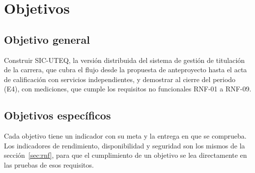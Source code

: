 \section{Objetivos}\label{sec:objetivos}

\subsection{Objetivo general}

Construir SIC-UTEQ, la versión distribuida del sistema de gestión de titulación de la carrera, que cubra el flujo desde la propuesta de anteproyecto hasta el acta de calificación con servicios independientes, y demostrar al cierre del periodo (E4), con mediciones, que cumple los requisitos no funcionales RNF-01 a RNF-09.

\subsection{Objetivos específicos}

Cada objetivo tiene un indicador con su meta y la entrega en que se comprueba. Los indicadores de rendimiento, disponibilidad y seguridad son los mismos de la sección~\ref{sec:rnf}, para que el cumplimiento de un objetivo se lea directamente en las pruebas de esos requisitos.

